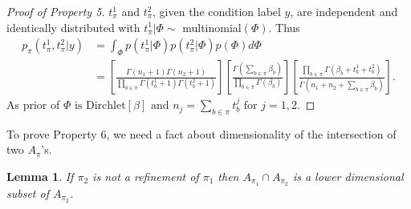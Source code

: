 \documentclass[aoas,preprint]{imsart}
\newtheorem{lemma}{Lemma}
\begin{document}
\begin{proof}[Proof of Property 5]
$t_\pi^1$ and $t_\pi^2$, given the condition label $y$, are independent and identically distributed with $t_\pi^1 |\Phi \sim$ multinomial$(\Phi)$. Thus
\begin{align*}
p_\pi(t^1_{\pi},t^2_{\pi}| y) &= \int_\Phi p(t_\pi^1 | \Phi) p(t_\pi^2 | \Phi) p(\Phi) d\Phi \\
&= \left[ \frac{ \Gamma(n_1+1) \Gamma(n_2+1) }{ \prod_{b \in \pi} \Gamma(t^1_b+1) 
   \Gamma( t^2_b + 1 )} \right] 
\left[ \frac{\Gamma( \sum_{b \in \pi} \beta_b  )}{
   \prod_{b \in \pi} \Gamma(\beta_b )} \right] 
 \left[ \frac{ \prod_{b \in \pi} \Gamma( \beta_b + t^1_b + t^2_b )}{
	\Gamma( n_1 + n_2 + \sum_{b \in \pi} \beta_b  )} \right].
\end{align*}
As prior of $\Phi \text{ is Dirchlet}[ \beta ] \text{ and } n_j = \sum_{b \in \pi} t_b^j \text{ for } j = 1,2$.
\end{proof}


To prove Property 6, we need a fact about  dimensionality of the intersection of two $A_\pi$'s. 
\begin{lemma}
If $\pi_2$ is not a refinement of $\pi_1$ then $A_{\pi_1} \cap A_{\pi_2}$ is a lower dimensional subset of $A_{\pi_2}$.
\end{lemma}
\end{document}
